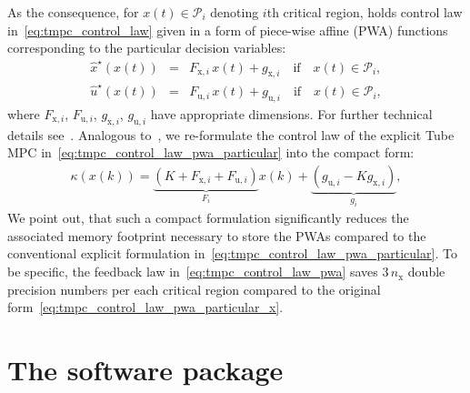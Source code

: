 \documentclass[letterpaper, 10 pt, conference]{ieeeconf}
\begin{document}
As the consequence, for $x(t) \in \mathcal{P}_{i}$ denoting $i$th critical region, holds control law in~\eqref{eq:tmpc_control_law} given in a form of
piece-wise affine (PWA) functions corresponding to the particular decision variables:
\begin{subequations}
	\label{eq:tmpc_control_law_pwa_particular}
	\begin{eqnarray}
		\label{eq:tmpc_control_law_pwa_particular_x}
		\hat{x}^{\star}(x(t)) \!\!\!\!&=&\!\!\!\! F_{\mathrm{x},i} \, x(t) + g_{\mathrm{x},i} \quad \text{if} \quad x(t) \in \mathcal{P}_{i}, \\
		\label{eq:tmpc_control_law_pwa_particular_u}
		\hat{u}^{\star}(x(t)) \!\!\!\!&=&\!\!\!\! F_{\mathrm{u},i} \, x(t) + g_{\mathrm{u},i} \quad \text{if} \quad x(t) \in \mathcal{P}_{i},
	\end{eqnarray}
\end{subequations}
where $F_{\mathrm{x},i}$, $F_{\mathrm{u},i}$, $g_{\mathrm{x},i}$, $g_{\mathrm{u},i}$ have appropriate dimensions. For further technical details see~\cite{BM02}. 
Analogous to~\cite{ZT14}, we re-formulate the control law of the explicit Tube MPC in~\eqref{eq:tmpc_control_law_pwa_particular} into the compact form:
\begin{eqnarray}
	\label{eq:tmpc_control_law_pwa}
	\kappa(x(k)) = \underbrace{ \left( K + F_{\mathrm{x},i} + F_{\mathrm{u},i} \right) }_{ F_{i} } x(k) + \underbrace{ \left( g_{\mathrm{u},i} - K g_{\mathrm{x},i} \right) }_{ g_{i} } ,
\end{eqnarray}
We point out, that such a compact formulation significantly reduces the associated memory footprint necessary to store the PWAs compared to the conventional explicit formulation in~\eqref{eq:tmpc_control_law_pwa_particular}.  
%
To be specific, the feedback law in~\eqref{eq:tmpc_control_law_pwa} saves $3\,n_\text{x}$ double precision numbers per each critical region compared to the original form~\eqref{eq:tmpc_control_law_pwa_particular_x}.
%

\section{The software package}
\label{sec:code}
\end{document}
